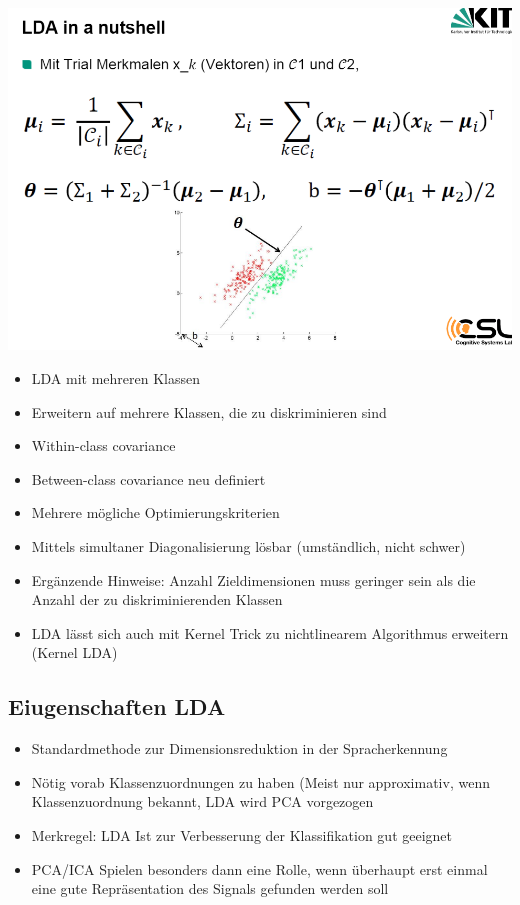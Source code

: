 \documentclass[a4paper,10pt,oneside]{article}
\begin{document}
\includegraphics[scale=0.65]{Grafiken/ldainanutshell.png}

\begin{itemize}
	\item LDA mit mehreren Klassen
	\item Erweitern auf mehrere Klassen, die zu diskriminieren sind
	\item Within-class covariance
	\item Between-class covariance neu definiert
	\item Mehrere mögliche Optimierungskriterien
	\item Mittels simultaner Diagonalisierung lösbar (umständlich, nicht schwer)
	\item Ergänzende Hinweise: Anzahl Zieldimensionen muss geringer sein als die Anzahl der zu diskriminierenden Klassen
	\item LDA lässt sich auch mit Kernel Trick zu nichtlinearem Algorithmus erweitern (Kernel LDA)
\end{itemize}


\subsection{Eiugenschaften LDA}
\begin{itemize}
	\item Standardmethode zur Dimensionsreduktion in der Spracherkennung
	\item Nötig vorab Klassenzuordnungen zu haben  (Meist nur approximativ, wenn Klassenzuordnung bekannt, LDA wird PCA vorgezogen
	\item Merkregel: LDA Ist zur Verbesserung der Klassifikation gut geeignet
	\item PCA/ICA Spielen besonders dann eine Rolle, wenn überhaupt erst einmal eine gute Repräsentation des Signals gefunden werden soll
\end{itemize}
\end{document}
